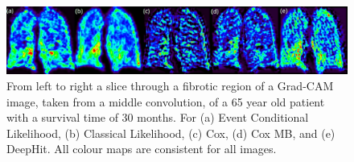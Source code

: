 \documentclass[portrait, color=UCLburgundy, margin=1cm]{uclposter}
\begin{document}
    \begin{figure}[H]
        \centering

        \includegraphics[width=1.0\linewidth]{grad_cam_label.png}
        
        \captionsetup{singlelinecheck=false, justification=centering}
        \begin{highlightbox}[UCLlightblue]
            \caption{
                From left to right a slice through a fibrotic region of a Grad-CAM image, taken from a middle convolution, of a 65 year old patient with a survival time of 30 months. For (a) Event Conditional Likelihood, (b) Classical Likelihood, (c) Cox, (d) Cox \gls{MB}, and (e) DeepHit. All colour maps are consistent for all images.
            }
        \end{highlightbox}
    \end{figure}
\end{document}
